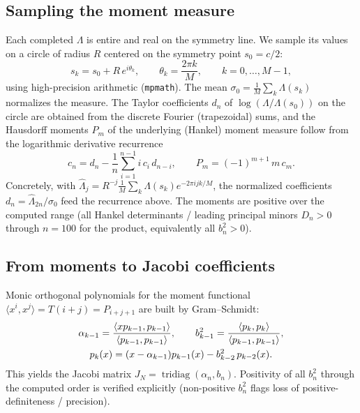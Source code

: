 \documentclass[aps,prx,reprint,floatfix]{revtex4-2}
\begin{document}
\subsection{Sampling the moment measure}
\label{sec:sampling}
Each completed $\Lambda$ is entire and real on the symmetry line. We sample
its values on a circle of radius $R$ centered on the symmetry point
$s_0=c/2$:
\begin{equation}
s_k = s_0 + R\,e^{i\theta_k},\qquad
\theta_k=\frac{2\pi k}{M},\qquad k=0,\dots,M-1,
\end{equation}
using high-precision arithmetic (\texttt{mpmath}). The mean
$\sigma_0=\frac1M\sum_k \Lambda(s_k)$ normalizes the measure. The Taylor
coefficients $d_n$ of $\log(\Lambda/\Lambda(s_0))$ on the circle are obtained
from the discrete Fourier (trapezoidal) sums, and the Hausdorff moments
$P_m$ of the underlying (Hankel) moment measure follow from the logarithmic
derivative recurrence
\begin{equation}
\label{eq:6}
c_n = d_n - \frac1n\sum_{i=1}^{n-1} i\,c_i\,d_{n-i},
\qquad
P_m = (-1)^{m+1}\,m\,c_m .
\end{equation}
Concretely, with $\widehat\Lambda_j=R^{-j}\frac1M\sum_k \Lambda(s_k)
e^{-2\pi i j k/M}$, the normalized coefficients $d_n=\widehat\Lambda_{2n}/\sigma_0$
feed the recurrence above. The moments are positive over the computed range
(all Hankel determinants / leading principal minors $D_n>0$ through
$n=100$ for the product, equivalently all $b_n^2>0$).

\subsection{From moments to Jacobi coefficients}
\label{sec:gs}
Monic orthogonal polynomials for the moment functional
$\langle x^i,x^j\rangle = T(i+j)=P_{i+j+1}$ are built by Gram--Schmidt:
\begin{gather}
\alpha_{k-1}=\frac{\langle xp_{k-1},p_{k-1}\rangle}{\langle p_{k-1},p_{k-1}\rangle},
\qquad
b_{k-1}^2=\frac{\langle p_k,p_k\rangle}{\langle p_{k-1},p_{k-1}\rangle},\notag\\
p_k(x)=(x-\alpha_{k-1})p_{k-1}(x)-b_{k-2}^2\,p_{k-2}(x).
\end{gather}
This yields the Jacobi matrix $J_{N}=\operatorname{tridiag}(\alpha_n,b_n)$.
Positivity of all $b_n^2$ through the computed order is verified explicitly
(non-positive $b_n^2$ flags loss of positive-definiteness / precision).
\end{document}
